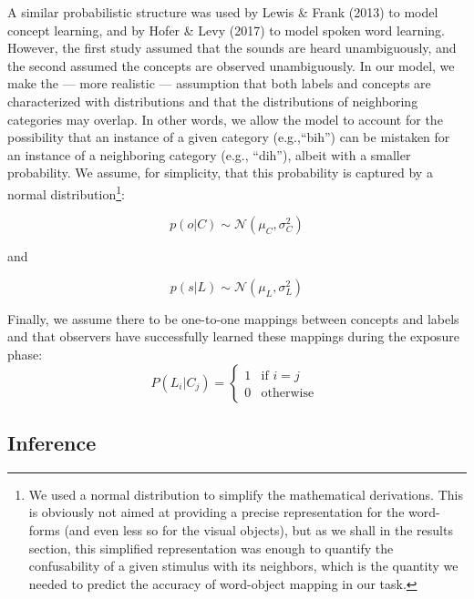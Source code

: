 \documentclass[english,,man]{apa6}
\let\rmarkdownfootnote\footnote%
\def\footnote{\protect\rmarkdownfootnote}
\begin{document}
A similar probabilistic structure was used by Lewis \& Frank (2013) to model concept learning, and by Hofer \& Levy (2017) to model spoken word learning. However, the first study assumed that the sounds are heard unambiguously, and the second assumed the concepts are observed unambiguously. In our model, we make the --- more realistic --- assumption that both labels and concepts are characterized with distributions and that the distributions of neighboring categories may overlap. In other words, we allow the model to account for the possibility that an instance of a given category (e.g.,\enquote{bih}) can be mistaken for an instance of a neighboring category (e.g., \enquote{dih}), albeit with a smaller probability. We assume, for simplicity, that this probability is captured by a normal distribution\footnote{We used a normal distribution to simplify the mathematical derivations. This is obviously not aimed at providing a precise representation for the word-forms (and even less so for the visual objects), but as we shall in the results section, this simplified representation was enough to quantify the confusability of a given stimulus with its neighbors, which is the quantity we needed to predict the accuracy of word-object mapping in our task.}:

\begin{equation} \label{eq:object}
 p(o | C) \sim  \mathcal{N}(\mu_C, \sigma^2_C) 
\end{equation}

\begin{center}
and 
\end{center}

\begin{equation} \label{eq:sound}
p(s| L) \sim  \mathcal{N}(\mu_L, \sigma^2_L)
\end{equation}

Finally, we assume there to be one-to-one mappings between concepts and labels and that observers have successfully learned these mappings during the exposure phase:
\begin{equation}\label{eq:mapping}
P(L_i|C_j) = 
\begin{cases}
  1 & \text{if  }  i=j \\  
  0  & \text{otherwise  }
\end{cases}
\end{equation}

\hypertarget{inference}{%
\subsection{Inference}\label{inference}}
\end{document}

